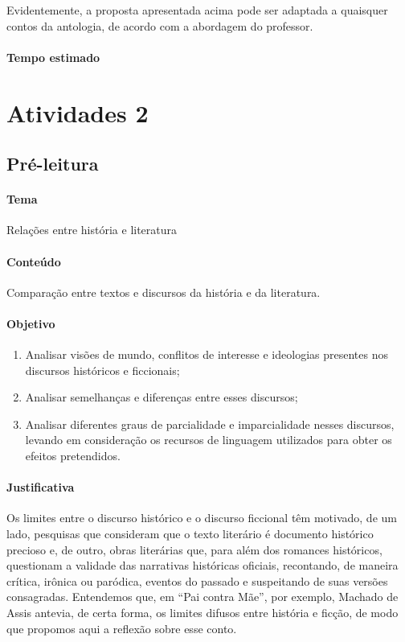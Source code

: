 \documentclass[11pt]{extarticle}
\begin{document}
Evidentemente, a proposta apresentada acima pode ser adaptada a
quaisquer contos da antologia, de acordo com a abordagem do professor.

\paragraph{Tempo estimado}

\section{Atividades 2}

\subsection{Pré-leitura}


\paragraph{Tema} Relações entre história e literatura

\paragraph{Conteúdo} Comparação entre textos e discursos da história e da
literatura.

\paragraph{Objetivo} 
\begin{enumerate}
\item
Analisar visões de mundo, conflitos de interesse e
ideologias presentes nos discursos históricos e ficcionais; 
\item
Analisar semelhanças e diferenças entre esses discursos; 
\item
Analisar diferentes
graus de parcialidade e imparcialidade nesses discursos, levando em
consideração os recursos de linguagem utilizados para obter os efeitos
pretendidos.
\end{enumerate}

\paragraph{Justificativa} Os limites entre o discurso histórico e o
discurso ficcional têm motivado, de um lado, pesquisas que consideram
que o texto literário é documento histórico precioso e, de outro, obras
literárias que, para além dos romances históricos, questionam a validade
das narrativas históricas oficiais, recontando, de maneira crítica,
irônica ou paródica, eventos do passado e suspeitando de suas versões
consagradas. Entendemos que, em ``Pai contra Mãe'', por exemplo, Machado
de Assis antevia, de certa forma, os limites difusos entre história e
ficção, de modo que propomos aqui a reflexão sobre esse conto.
\end{document}
